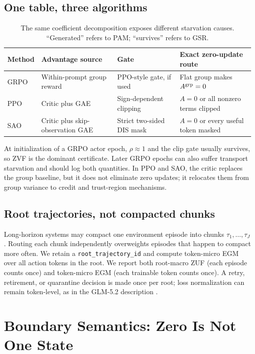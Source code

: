 \documentclass{article}
\begin{document}
\subsection{One table, three algorithms}

\begin{table}[t]
\centering
\caption{The same coefficient decomposition exposes different starvation
causes.  ``Generated'' refers to PAM; ``survives'' refers to GSR.}
\label{tab:unification}
\small
\begin{tabularx}{\linewidth}{@{}lXXX@{}}
\toprule
Method & Advantage source & Gate & Exact zero-update route \\
\midrule
GRPO & Within-prompt group reward & PPO-style gate, if used & Flat group makes $A^{\rm grp}=0$ \\
PPO & Critic plus GAE & Sign-dependent clipping & $A=0$ or all nonzero terms clipped \\
SAO & Critic plus skip-observation GAE & Strict two-sided DIS mask & $A=0$ or every useful token masked \\
\bottomrule
\end{tabularx}
\end{table}

At initialization of a GRPO actor epoch, $\rho\approx1$ and the clip gate
usually survives, so ZVF is the dominant certificate.  Later GRPO epochs can
also suffer transport starvation and should log both quantities.  In PPO and
SAO, the critic replaces the group baseline, but it does not eliminate zero
updates; it relocates them from group variance to credit and trust-region
mechanisms.

\subsection{Root trajectories, not compacted chunks}

Long-horizon systems may compact one environment episode into chunks
$\tau_1,\ldots,\tau_J$.  Routing each chunk independently overweights episodes
that happen to compact more often.  We retain a \texttt{root\_trajectory\_id}
and compute token-micro EGM over all action tokens in the root.  We report both
root-macro ZUF (each episode counts once) and token-micro EGM (each trainable
token counts once).  A retry, retirement, or quarantine decision is made once
per root; loss normalization can remain token-level, as in the GLM-5.2
description \citep{glm2026glm52}.

\section{Boundary Semantics: Zero Is Not One State}
\label{sec:semantics}
\end{document}
